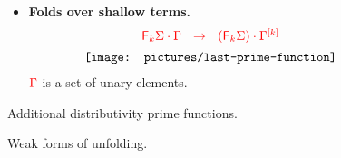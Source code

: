\begin{figure}
{\begin{minipage}{1\linewidth}
\begin{itemize}
$$\begin{array}{c}
 {\texttt{[image: pictures/shallow-fold-distrib]}} 
\end{array}
$$
\item \textbf{Folds over shallow terms.} 
$$
\begin{array}{c}
 {\color{red}{{\color{red}{\mathsf F_{k}}}\Sigma\cdot \Gamma\ \ \to \ \ ({\color{red}{\mathsf F_{k}}}\Sigma) \cdot \Gamma^{{\color{red}{[k]}}}}}\\[5pt]
 {\texttt{[image: pictures/last-prime-function]}} 
\end{array}
$$
${\color{red}{\Gamma}}$ is a set of unary elements.
\end{itemize}
\end{minipage}
}
\caption{Additional distributivity prime functions.} \label{fig:additional-distrib-prime}
\end{figure}

\begin{figure}
\caption{Weak forms of unfolding.}\label{fig:weak-unfolding}
\end{figure}